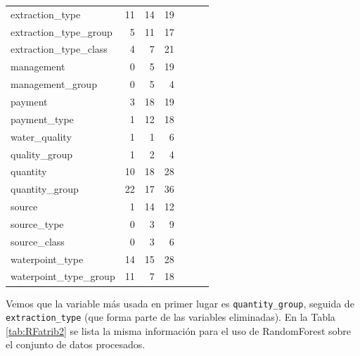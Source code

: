 \documentclass[a4paper, 20pt]{article}
\begin{document}
\begin{table}[H]
\begin{tabular}{lrrrrrr}
extraction\_type & 11 & 14 & 19 \\
extraction\_type\_group & 5 & 11 & 17 \\
extraction\_type\_class & 4 & 7 & 21 \\
management & 0 & 5 & 19 \\
management\_group & 0 & 5 & 4 \\
payment & 3 & 18 & 19 \\
payment\_type & 1 & 12 & 18 \\
water\_quality & 1 & 1 & 6 \\
quality\_group & 1 & 2 & 4 \\
quantity & 10 & 18 & 28 \\
quantity\_group & 22 & 17 & 36 \\
source & 1 & 14 & 12 \\
source\_type & 0 & 3 & 9 \\
source\_class & 0 & 3 & 6 \\
waterpoint\_type & 14 & 15 & 28 \\
waterpoint\_type\_group & 11 & 7 & 18 \\
\bottomrule
\end{tabular}
\end{table}

Vemos que la variable más usada en primer lugar es \texttt{quantity\_group}, seguida de \texttt{extraction\_type} (que forma parte de las variables eliminadas).  En la Tabla \ref{tab:RFatrib2} se lista la misma información para el uso de RandomForest sobre el conjunto de datos procesados.
\end{document}
